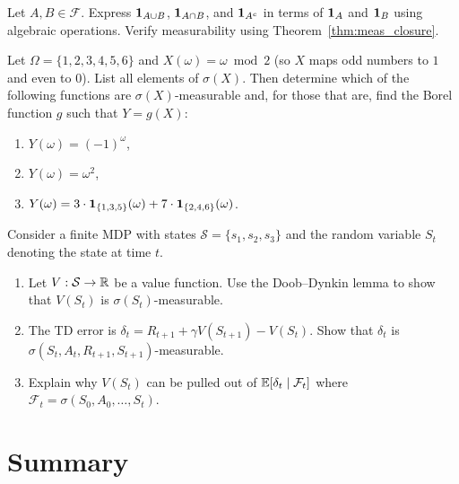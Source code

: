 \documentclass[11pt,a4paper]{article}
\begin{document}
\begin{exercise}
\label{ex:indicator_algebra}
Let $A, B \in \mathcal{F}$. Express $\mathbf{1}_{A \cup B}$,
$\mathbf{1}_{A \cap B}$, and $\mathbf{1}_{A^c}$ in terms of
$\mathbf{1}_A$ and $\mathbf{1}_B$ using algebraic operations. Verify
measurability using Theorem~\ref{thm:meas_closure}.
\end{exercise}

\begin{exercise}
\label{ex:doob_dynkin_concrete}
Let $\Omega = \{1, 2, 3, 4, 5, 6\}$ and $X(\omega) = \omega \bmod 2$
(so $X$ maps odd numbers to $1$ and even to $0$). List all elements of
$\sigma(X)$. Then determine which of the following functions are
$\sigma(X)$-measurable and, for those that are, find the Borel function
$g$ such that $Y = g(X)$:
\begin{enumerate}[nosep,label=(\alph*)]
  \item $Y(\omega) = (-1)^\omega$,
  \item $Y(\omega) = \omega^2$,
  \item $Y(\omega) = 3 \cdot \mathbf{1}_{\{1,3,5\}}(\omega) + 7 \cdot
    \mathbf{1}_{\{2,4,6\}}(\omega)$.
\end{enumerate}
\end{exercise}

\begin{exercise}[RL Application]
\label{ex:rl_doob_dynkin}
Consider a finite MDP with states $\mathcal{S} = \{s_1, s_2, s_3\}$ and
the random variable $S_t$ denoting the state at time $t$.
\begin{enumerate}[nosep,label=(\alph*)]
  \item Let $V: \mathcal{S} \to \mathbb{R}$ be a value function. Use the
    Doob--Dynkin lemma to show that $V(S_t)$ is $\sigma(S_t)$-measurable.
  \item The TD error is $\delta_t = R_{t+1} + \gamma V(S_{t+1}) - V(S_t)$.
    Show that $\delta_t$ is $\sigma(S_t, A_t, R_{t+1}, S_{t+1})$-measurable.
  \item Explain why $V(S_t)$ can be pulled out of
    $\mathbb{E}[\delta_t \mid \mathcal{F}_t]$ where
    $\mathcal{F}_t = \sigma(S_0, A_0, \ldots, S_t)$.
\end{enumerate}
\end{exercise}


\section{Summary}
\label{sec:summary}
\end{document}
